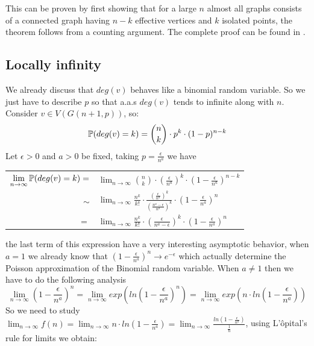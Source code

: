 This can be proven by first showing that for a large $n$ almost all graphs consists of a connected graph having $n-k$ effective vertices and $k$ isolated points, the theorem follows from a counting argument. The complete proof can be found in \cite[Erdös-Rényi, 59]{OnRandomGraphs}.
 
\subsection{Locally infinity}

We already discuss that $deg(v)$ behaves like a binomial random variable. So we just have to describe $p$ so that a.a.s $deg(v)$ tends to infinite along with $n$. Consider $v\in V(G(n+1,p))$, so:
$$ \P(deg(v)=k) = \binom{n}{k} \cdot p^{k} \cdot (1-p)^{n-k}$$
Let $\epsilon>0$ and $a>0$ be fixed, taking $p=\frac{\epsilon}{n^{a}}$ we have
\begin{center}
\begin{tabular}{ r l }
 $\displaystyle\lim_{n\to \infty } \P(deg(v)=k) =$ & $\displaystyle\lim_{n\to \infty} \binom{n}{k} \cdot \left( \frac{\epsilon}{n^a} \right)^k \cdot \left( 1-\frac{\epsilon}{n^a}\right)^{n-k}$ \\
 $\sim$ &  $\displaystyle\lim_{n\to \infty} \frac{n^k}{k!}\cdot  \frac{\left(\frac{\epsilon}{n^a}\right)^k} {\left(\frac{n^a - \epsilon}{n^a}\right)^k} \cdot \left(1-\frac{\epsilon}{n^a}\right)^{n} $\\
$=$ &  $\displaystyle\lim_{n\to \infty} \frac{n^k}{k!}\cdot \left(\frac{\epsilon} {n^a - \epsilon}\right)^k \cdot \left(1-\frac{\epsilon}{n^a}\right)^{n} $\\
\end{tabular}
\end{center}
the last term of this expression have a very interesting asymptotic behavior, when $a=1$ we already know that $\left(1-\frac{\epsilon}{n^a}\right)^{n} \to e^{-\epsilon}$ which actually determine the Poisson approximation of the Binomial random variable. When $a\neq 1$ then we have to do the following analysis
$$\displaystyle\lim_{n\to \infty } \left( 1 - \frac{\epsilon}{n^a}\right)^n = \displaystyle\lim_{n\to \infty} exp\left( ln \left( 1 - \frac{\epsilon}{n^a}\right)^n\right) = \displaystyle\lim_{n\to \infty} exp\left(n \cdot ln \left( 1 - \frac{\epsilon}{n^a}\right)\right)$$
So we need to study $\displaystyle\lim_{n\to \infty} f(n) = \displaystyle\lim_{n\to \infty} n \cdot ln \left( 1 - \frac{\epsilon}{n^a}\right)= \displaystyle\lim_{n\to \infty}\frac{ln \left( 1 - \frac{\epsilon}{n^a}\right)}{\frac{1}{n}}$, using L'ôpital's rule for limits we obtain:
